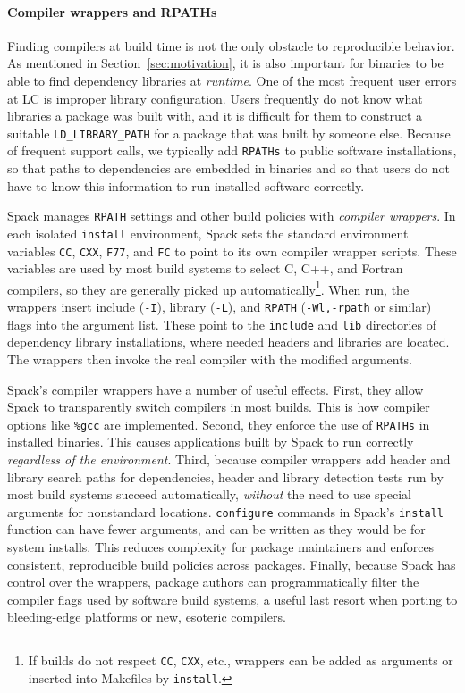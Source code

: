 \paragraph{Compiler wrappers and RPATHs}
Finding compilers at build time is not the only obstacle to reproducible
behavior.  As mentioned in Section~\ref{sec:motivation}, it is also important
for binaries to be able to find dependency libraries at {\it runtime}.
One of the most frequent user errors at LC is improper library configuration.
Users frequently do not know what libraries a package was built with, and 
it is difficult for them to construct a suitable {\tt LD\_LIBRARY\_PATH} for
a package that was built by someone else.  Because of frequent support calls,
we typically add {\tt RPATHs} to public software installations, so that paths
to dependencies are embedded in binaries and so that users do not have to know
this information to run installed software correctly.

Spack manages {\tt RPATH} settings and other build policies with
{\it compiler wrappers}. 
In each isolated {\tt install} environment, Spack sets the standard 
environment variables
{\tt CC}, {\tt CXX}, {\tt F77}, and {\tt FC} to point to its own compiler
wrapper scripts.  These variables are used by most build systems to select
C, C++, and Fortran compilers, so they are generally picked up 
automatically\footnote{If builds do not respect {\tt CC}, {\tt CXX}, etc.,
wrappers can be added as arguments or inserted into Makefiles
by {\tt install}.}.
When run, the wrappers insert include ({\tt -I}), library ({\tt -L}), and 
{\tt RPATH} ({\tt -Wl,-rpath} or similar) flags into the argument list.
These point to the {\tt include} and {\tt lib} directories of dependency
library installations, where needed headers and libraries are located.
The wrappers then invoke the real compiler with the modified arguments.

Spack's compiler wrappers have a number of useful effects.  First, they allow
Spack to transparently switch compilers in most builds.  This is how
compiler options like {\tt \%gcc} are implemented.  Second, they enforce the
use of {\tt RPATHs} in
installed binaries.  This causes applications built by Spack to run correctly
{\it regardless of the environment}.  Third, because compiler wrappers add 
header and library search paths for dependencies, header and library detection
tests run by most build systems succeed automatically, {\it without}
the need to use special arguments for nonstandard locations.  {\tt configure}
commands in Spack's {\tt install} function can have fewer arguments, and can
be written as they would be for system installs.  This reduces complexity
for package maintainers and enforces consistent, reproducible
build policies across packages.  Finally, because Spack has control over the 
wrappers, package authors can programmatically filter the compiler flags
used by software build systems, a useful last resort when porting to
bleeding-edge platforms or new, esoteric compilers.

